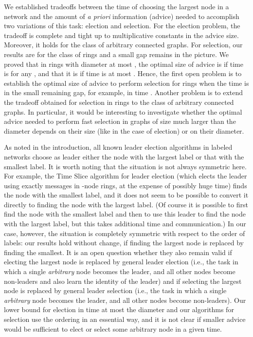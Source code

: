 \documentclass[11pt]{article}
\begin{document}
We established tradeoffs between the time of choosing the largest node in a network and the amount of {\em a priori} information (advice) needed
to accomplish two variations of this task: election and selection. For the election problem, the tradeoff is complete and tight up to multiplicative constants
in the advice size.
Moreover, it holds for the class of arbitrary connected graphs.
For selection, our results are for the class of rings and a small gap remains in the picture. 
We proved that in rings with diameter  at most , 
the optimal size of advice is  if time is
 for any , and that it is  if time is at most .
Hence, the first open problem is to establish the optimal size of advice to perform selection for rings when the time is in the small remaining gap, for example, in time .  Another problem is to extend the tradeoff obtained for selection in rings to the class
of arbitrary connected graphs. In particular, it would be interesting to investigate whether the optimal advice needed to perform fast selection in graphs of size much larger
than the diameter depends on their size (like in the case of election) or on their diameter.

As noted in the introduction, all known leader election algorithms in labeled networks choose as leader either the node with the largest label or that with 
the smallest label. It is worth noting that the situation is not always symmetric here. For example, the Time Slice algorithm for leader election \cite{Ly} (which elects the
leader using exactly  messages in -node rings, at the expense of possibly huge time) finds the node
with the smallest label, and it does not seem to be possible to convert it directly to finding the node with the largest label. (Of course it is possible to first
find the node with the smallest label and then to use this leader to find the node with the largest label, but this takes additional time and communication.)
In our case, however, the situation is completely symmetric with respect to the order of labels: our results hold without change, if finding the largest node is replaced by finding the smallest. It is an open question whether they also remain valid if electing the largest node is replaced by general leader election (i.e., the task
in which a single {\em arbitrary} node becomes the leader, and all other nodes become non-leaders and also learn the identity of the leader) and if selecting the largest
node is replaced by general  leader selection  (i.e., the task
in which a single {\em arbitrary} node becomes the leader, and all other nodes become non-leaders). 
Our lower bound for election in time at most the diameter and our algorithms for selection use the ordering in an essential way, and it is not clear if smaller advice would be sufficient to elect or select some arbitrary node in a given time.
\end{document}
